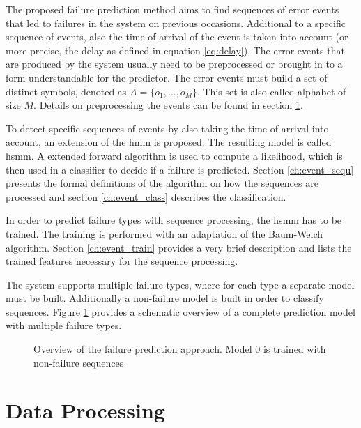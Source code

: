 \documentclass[mscthesis]{usiinfthesis}
\begin{document}
The proposed failure prediction method aims to find sequences of error events
that led to failures in the system on previous occasions. Additional to
a specific sequence of events, also the time of arrival of the event is taken
into account (or more precise, the delay as defined in equation
\ref{eq:delay}). The error events that are produced by the system usually need
to be preprocessed or brought in to a form understandable for the predictor.
The error events must build a set of distinct symbols, denoted as $A=\{o_1,
\dots, o_M\}$. This set is also called alphabet of size $M$. Details on
preprocessing the events can be found in section \ref{ch:event_data}.

To detect specific sequences of events by also taking the time of arrival into
account, an extension of the \gls{hmm} is proposed. The resulting model is
called \acrfull{hsmm}. A extended forward algorithm is used to compute
a likelihood, which is then used in a classifier to decide if a failure is
predicted. Section \ref{ch:event_sequ} presents the formal definitions of the
algorithm on how the sequences are processed and section \ref{ch:event_class}
describes the classification.

In order to predict failure types with sequence processing, the \gls{hsmm} has
to be trained. The training is performed with an adaptation of the Baum-Welch
algorithm. Section \ref{ch:event_train} provides a very brief description and
lists the trained features necessary for the sequence processing.

The system supports multiple failure types, where for each type a separate
model must be built. Additionally a non-failure model is built in order to
classify sequences. Figure \ref{fig:model} provides a schematic overview of
a complete prediction model with multiple failure types.

\begin{figure}
    \centering
    
    \caption{Overview of the failure prediction approach. Model 0 is trained
        with non-failure sequences}
    \label{fig:model}
\end{figure}

\section{Data Processing}
\label{ch:event_data}
\end{document}
